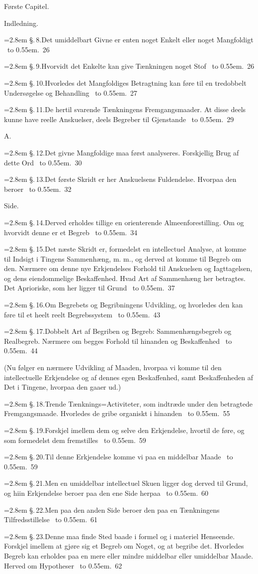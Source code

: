 \documentclass[12pt]{book}
\def\sperr#1{#1}%
\def\textit#1{#1}%
\def\\{ }%
\newcommand{\sperr}[1]{\textls[180]{#1}}
\newcommand{\ovside}{\par\nopagebreak\hfill{\footnotesize Side.}\par\nobreak\vspace{0.2\baselineskip}}
\newcommand{\ovgroup}[1]{%
  \par\vspace{0.7\baselineskip}\begin{center}{#1\par}\end{center}
  \vspace{0.3\baselineskip}}
\newcommand{\ovcap}[2]{%
  \par\vspace{1.0\baselineskip}%
  \begin{center}{\sperr{#1}\par}\vspace{0.3\baselineskip}{#2\par}\end{center}
  \vspace{0.4\baselineskip}}
\newcommand{\ovrubrik}[2]{%
  \par\vspace{0.9\baselineskip}%
  \begin{center}{\textit{#1}\par}\vspace{0.25\baselineskip}{#2\par}\end{center}
  \vspace{0.4\baselineskip}}
\newcommand{\ovnote}[1]{%
  \par\vspace{0.5\baselineskip}\begin{center}\begin{minipage}{0.86\linewidth}
  \centering #1\end{minipage}\end{center}\vspace{0.4\baselineskip}}
\newcommand{\ovline}[3]{%
  \par\vspace{0.25\baselineskip}%
  \noindent\hangindent=2.8em\hangafter=1
  \textit{\S.\,#1.}\quad #2%
  \nobreak\ \leaders\hbox to 0.55em{\hss.\hss}\hfill\ \textit{#3}\par}
\begin{document}
\ovcap{Første Capitel.}{Om den undersøgende og behandlende Tænknings
  forskjellige Fremgangsmaader, og den Erkjendelse, som derved opnaaes.}

\ovgroup{Indledning.}
\ovline{8}{Det umiddelbart Givne er enten noget Enkelt eller noget
  Mangfoldigt}{26}
\ovline{9}{Hvorvidt det Enkelte kan give Tænkningen noget Stof}{26}
\ovline{10}{Hvorledes det Mangfoldiges Betragtning kan føre til en tredobbelt
  Undersøgelse og Behandling}{27}
\ovline{11}{De hertil svarende Tænkningens Fremgangsmaader. At disse deels
  kunne have reelle Anskuelser, deels Begreber til Gjenstande}{29}

\ovrubrik{A.}{Reel Sammenhængs=Analyse\\
  eller\\
  Reelle Gjenstandes Analyse ifølge Grundbegrebet om reel Sammenhæng.}
\ovline{12}{Det givne Mangfoldige maa først analyseres. Forskjellig Brug af
  dette Ord}{30}
\ovline{13}{Det første Skridt er her Anskuelsens Fuldendelse. Hvorpaa den
  beroer}{32}

\ovside
\ovline{14}{Derved erholdes tillige en orienterende Almeenforestilling. Om og
  hvorvidt denne er et Begreb}{34}
\ovline{15}{Det næste Skridt er, formedelst en intellectuel Analyse, at komme
  til Indsigt i Tingens Sammenhæng, m. m., og derved at komme til Begreb om den.
  Nærmere om denne nye Erkjendelses Forhold til Anskuelsen og Iagttagelsen, og
  dens eiendommelige Beskaffenhed. Hvad Art af Sammenhæng her betragtes. Det
  Aprioriske, som her ligger til Grund}{37}
\ovline{16}{Om Begrebets og Begribningens Udvikling, og hvorledes den kan føre
  til et heelt reelt Begrebssystem}{43}
\ovline{17}{Dobbelt Art af Begriben og Begreb: Sammenhængsbegreb og
  Realbegreb. Nærmere om begges Forhold til hinanden og Beskaffenhed}{44}

\ovnote{(Nu følger en nærmere Udvikling af Maaden, hvorpaa vi komme til den
  intellectuelle Erkjendelse og af dennes egen Beskaffenhed, samt
  Beskaffenheden af Det i Tingene, hvorpaa den gaaer ud.)}

\ovline{18}{Trende Tænknings=Activiteter, som indtræde under den betragtede
  Fremgangsmaade. Hvorledes de gribe organiskt i hinanden}{55}
\ovline{19}{Forskjel imellem dem og selve den Erkjendelse, hvortil de føre, og
  som formedelst dem fremstilles}{59}
\ovline{20}{Til denne Erkjendelse komme vi paa en middelbar Maade}{59}
\ovline{21}{Men en umiddelbar intellectuel Skuen ligger dog derved til Grund,
  og hiin Erkjendelse beroer paa den ene Side herpaa}{60}
\ovline{22}{Men paa den anden Side beroer den paa en Tænkningens
  Tilfredsstillelse}{61}
\ovline{23}{Denne maa finde Sted baade i formel og i materiel Henseende.
  Forskjel imellem at gjøre sig et Begreb om Noget, og at begribe det. Hvorledes
  Begreb kan erholdes paa en mere eller mindre middelbar eller umiddelbar Maade.
  Herved om Hypotheser}{62}
\end{document}
